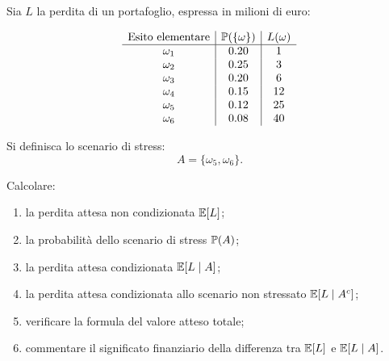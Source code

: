 \begin{exercise}
\label{ex:cap3-prop-perdita-stress}

Sia $L$ la perdita di un portafoglio, espressa in milioni di euro:

\[
\begin{array}{c|c|c}
\text{Esito elementare} & \mathbb{P}(\{\omega\}) & L(\omega) \\
\hline
\omega_1 & 0.20 & 1 \\
\omega_2 & 0.25 & 3 \\
\omega_3 & 0.20 & 6 \\
\omega_4 & 0.15 & 12 \\
\omega_5 & 0.12 & 25 \\
\omega_6 & 0.08 & 40 \\
\end{array}
\]

Si definisca lo scenario di stress:
\[
A=\{\omega_5,\omega_6\}.
\]

Calcolare:

\begin{enumerate}
    \item la perdita attesa non condizionata $\mathbb{E}[L]$;

    \item la probabilit\`{a} dello scenario di stress $\mathbb{P}(A)$;

    \item la perdita attesa condizionata $\mathbb{E}[L\mid A]$;

    \item la perdita attesa condizionata allo scenario non stressato
    $\mathbb{E}[L\mid A^c]$;

    \item verificare la formula del valore atteso totale;

    \item commentare il significato finanziario della differenza tra
    $\mathbb{E}[L]$ e $\mathbb{E}[L\mid A]$.
\end{enumerate}

\end{exercise}

